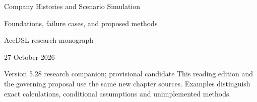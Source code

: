 \documentclass[11pt,a4paper]{report}
\begin{document}
\hypersetup{pageanchor=false}
\begin{titlepage}
{\Huge Company Histories and Scenario Simulation\par}
\vspace{12mm}
{\Large Foundations, failure cases, and proposed methods\par}
\vspace{8mm}
AccDSL research monograph\par 27 October 2026\par Version 5.28 research companion; provisional candidate
\vfill
This reading edition and the governing proposal use the same new chapter sources. Examples distinguish exact calculations, conditional assumptions and unimplemented methods.
\end{titlepage}
\hypersetup{pageanchor=true}
\tableofcontents
\clearpage{}


























\clearpage\label{sim:body-end}

\begingroup\raggedright
\endgroup
\end{document}
